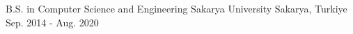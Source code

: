 

\begin{cventries}

  \cventry
    {B.S. in Computer Science and Engineering} %
    {Sakarya University} %
    {Sakarya, Turkiye} %
    {Sep. 2014 - Aug. 2020} %
    {}

\end{cventries}
